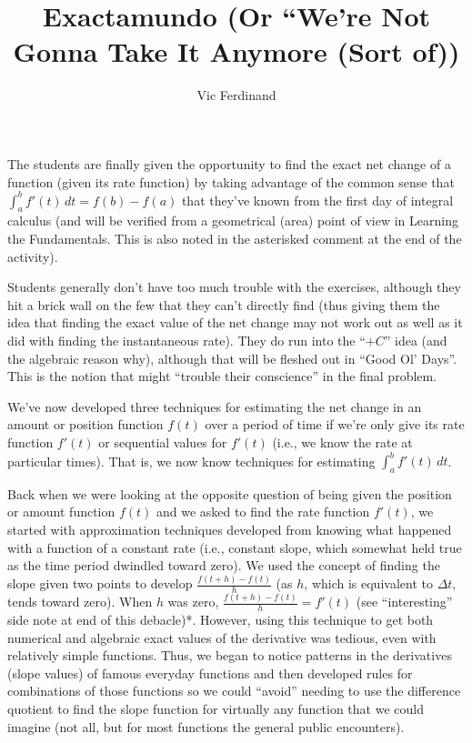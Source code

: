 \documentclass{ximera}
\author{Vic Ferdinand}
\title{Exactamundo (Or ``We're Not Gonna Take It Anymore (Sort of))}
\begin{document}
\begin{abstract}
\end{abstract}
\maketitle

\begin{instructorIntro}
The students are finally given the opportunity to find the exact net change of a function (given its rate function) by taking advantage of the common sense that $\int_a^b f'(t)\, dt = f(b) - f(a)$ that they've known from the first day of integral calculus (and will be verified from a geometrical (area) point of view in Learning the Fundamentals.  This is also noted in the asterisked comment at the end of the activity).  

Students generally don't have too much trouble with the exercises, although they hit a brick wall on the few that they can't directly find (thus giving them the idea that finding the exact value of the net change may not work out as well as it did with finding the instantaneous rate).  They do run into the ``$+C$'' idea (and the algebraic reason why), although that will be fleshed out in ``Good Ol' Days''.  This is the notion that might “trouble their conscience” in the final problem.

\end{instructorIntro}


We've now developed three techniques for estimating the net change in an amount or position function $f(t)$  over a period of time if we're only give its rate function $f'(t)$ or sequential values for  $f'(t)$ (i.e., we know the rate at particular times).  That is, we now know techniques for estimating  $\int_a^b f'(t) \, dt$.

Back when we were looking at the opposite question of being given the position or amount function $f(t)$ and we asked to find the rate function  $f'(t)$, we started with approximation techniques developed from knowing what happened with a function of a constant rate (i.e., constant slope, which somewhat held true as the time period dwindled toward zero).  We used the concept of finding the slope given two points to develop $\frac{f(t+h) - f(t)}{h}$ (as $h$, which is equivalent to $\Delta t$, tends toward zero).  When $h$ was zero,  $\frac{f(t+h) - f(t)}{h} = f'(t)$ (see ``interesting'' side note at end of this debacle)*.  However, using this technique to get both numerical and algebraic exact values of the derivative was tedious, even with relatively simple functions.  Thus, we began to notice patterns in the derivatives (slope values) of famous everyday functions and then developed rules for combinations of those functions so we could ``avoid'' needing to use the difference quotient to find the slope function for virtually any function that we could imagine (not all, but for most functions the general public encounters).
\end{document}

